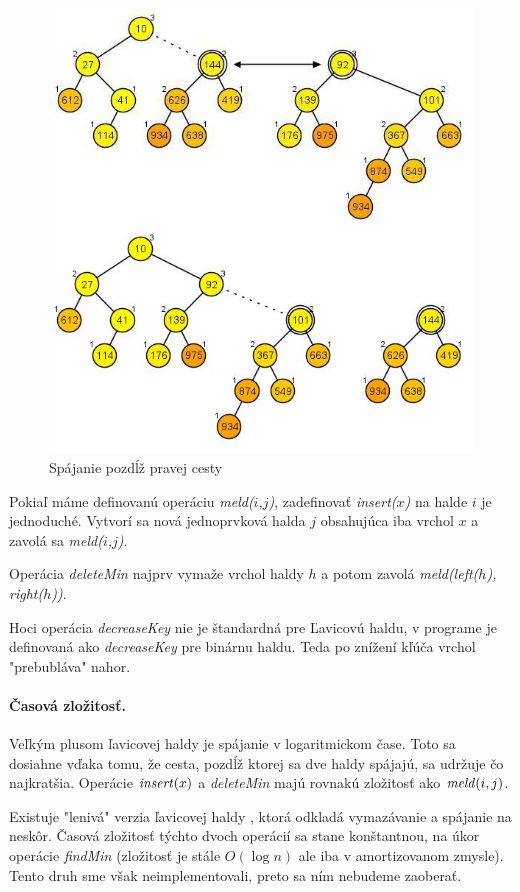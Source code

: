 \begin{figure}
\includegraphics[width=\columnwidth]{obrazky/leftistmeld.png}
\caption{\emph{} 
Spájanie pozdĺž pravej cesty} 
\label{img:leftmeld} 
\end{figure}

Pokiaľ máme definovanú operáciu \emph{meld($i$,$j$)}, zadefinovať \emph{insert($x$)} na halde $i$ je jednoduché. Vytvorí sa nová jednoprvková halda $j$ obsahujúca iba vrchol $x$ a zavolá sa \emph{meld($i$,$j$)}.

Operácia \emph{deleteMin} najprv vymaže vrchol haldy $h$ a potom zavolá \emph{meld(left($h$), right($h$))}.

Hoci operácia \emph{decreaseKey} nie je štandardná pre Ľavicovú haldu, v programe je definovaná ako \emph{decreaseKey} pre 
binárnu haldu. Teda po znížení kľúča vrchol "prebubláva" nahor.

\paragraph{Časová zložitosť.}
Veľkým plusom ľavicovej haldy je spájanie v logaritmickom čase. 
Toto sa dosiahne vďaka tomu, že cesta, pozdĺž ktorej sa dve haldy spájajú, sa udržuje čo 
najkratšia. Operácie $\mathop{\mathit{insert}}(x)$ a \emph{deleteMin} majú rovnakú zložitosť ako $\mathop{\mathit{meld}}(i,j)$.

Existuje "lenivá" verzia ľavicovej haldy \citep{left}, ktorá odkladá vymazávanie a spájanie na neskôr.
Časová zložitosť týchto dvoch operácií sa stane konštantnou, na úkor operácie \emph{findMin} (zložitosť
je stále $O(\log n)$ ale iba v amortizovanom zmysle).
Tento druh sme však neimplementovali, preto sa ním nebudeme zaoberať.
